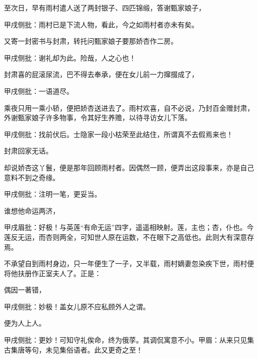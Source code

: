 \begin{parag}
    至次日，早有雨村遣人送了两封银子、四匹锦缎，答谢甄家娘子，\begin{note}甲戌侧批：雨村已是下流人物，看此，今之如雨村者亦未有矣。\end{note}又寄一封密书与封肃，转托问甄家娘子要那娇杏作二房。\begin{note}甲戌侧批：谢礼却为此。险哉，人之心也！\end{note}封肃喜的屁滚尿流，巴不得去奉承，便在女儿前一力撺掇成了，\begin{note}甲戌侧批：一语道尽。\end{note}乘夜只用一乘小轿，便把娇杏送进去了。雨村欢喜，自不必说，乃封百金赠封肃，外谢甄家娘子许多物事，令其好生养赡，以待寻访女儿下落。\begin{note}甲戌侧批：找前伏后。士隐家一段小枯荣至此结住，所谓真不去假焉来也！\end{note}封肃回家无话。
\end{parag}


\begin{parag}
    却说娇杏这丫鬟，便是那年回顾雨村者。因偶然一顾，便弄出这段事来，亦是自己意料不到之奇缘。\begin{note}甲戌侧批：注明一笔，更妥当。\end{note}谁想他命运两济，\begin{note}甲戌眉批：好极！与英莲“有命无运”四字，遥遥相映射。莲，主也；杏，仆也。今莲反无运，而杏则两全，可知世人原在运数，不在眼下之高低也。此则大有深意存焉。\end{note}不承望自到雨村身边，只一年便生了一子，又半载，雨村嫡妻忽染疾下世，雨村便将他扶册作正室夫人了。正是：
\end{parag}


\begin{poem}

    \begin{pl}
        偶因一著错，\end{pl}\begin{note}甲戌侧批：妙极！盖女儿原不应私顾外人之谓。\end{note}
    \begin{pl}
        便为人上人。\end{pl}\begin{note}甲戌侧批：更妙！可知守礼俟命，终为俄莩。其调侃寓意不小。甲眉：从来只见集古集唐等句，未见集俗语者。此又更奇之至！\end{note}

\end{poem}


